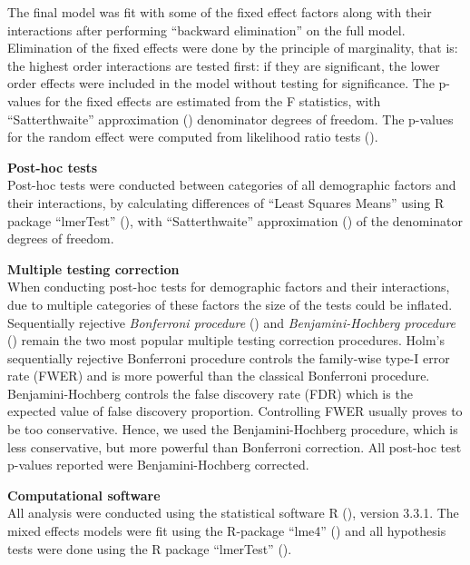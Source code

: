 \documentclass[11pt]{extarticle} %
\begin{document}
The final model was fit with some of the fixed effect factors along with their interactions after performing ``backward elimination'' on the full model. Elimination of the fixed effects were done by the principle of marginality, that is: the highest order interactions are tested first: if they are significant, the lower order effects were included in the model without testing for significance. The p-values for the fixed effects are estimated from the F statistics, with ``Satterthwaite'' approximation (\cite{Satterthwaite_1946_Biometrics}) denominator degrees of freedom. The p-values for the random effect were computed from likelihood ratio tests (\cite{Morrell_1998_Biometrics}). 

\noindent
{\bf{Post-hoc tests}} \\
Post-hoc tests were conducted between categories of all demographic factors and their interactions, by calculating differences of ``Least Squares Means'' using R package ``lmerTest'' (\cite{Kuznetsova_etal_2015_R-lmerTest}), with ``Satterthwaite'' approximation (\cite{Satterthwaite_1946_Biometrics}) of the denominator degrees of freedom.

\noindent
{\bf{Multiple testing correction}}\\
When conducting post-hoc tests for demographic factors and their interactions, due to multiple categories of these factors the size of the tests could be inflated. Sequentially rejective {\emph{Bonferroni procedure}} (\cite{Holm_1979_SJS}) and {\emph{Benjamini-Hochberg procedure}} (\cite{Benjamini_Hochberg_1995_JRSSB}) remain the two most popular multiple testing correction procedures. Holm's sequentially rejective Bonferroni procedure controls the family-wise type-I error rate (FWER) and is more powerful than the classical Bonferroni procedure. Benjamini-Hochberg controls the false discovery rate (FDR) which is the expected value of false discovery proportion. Controlling FWER usually proves to be too conservative. Hence, we used the Benjamini-Hochberg procedure, which is less conservative, but more powerful than Bonferroni correction. All post-hoc test p-values reported were Benjamini-Hochberg corrected.

\noindent
{\bf{Computational software}}\\
All analysis were conducted using the statistical software R (\cite{R}), version 3.3.1. The mixed effects models were fit using the R-package ``lme4'' (\cite{R-lme4}) and all hypothesis tests were done using the R package ``lmerTest'' (\cite{Kuznetsova_etal_2015_R-lmerTest}). 
\end{document}
